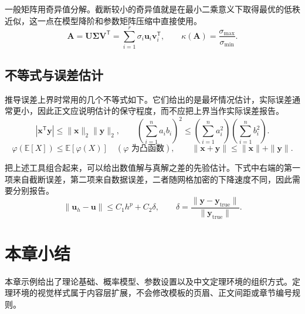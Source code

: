 一般矩阵用奇异值分解。截断较小的奇异值就是在最小二乘意义下取得最优的低秩近似，这一点在模型降阶和参数矩阵压缩中直接使用。
\begin{equation}
  \bm{A}=\bm{U}\bm{\Sigma}\bm{V}^{\mathsf T}
  =\sum_{i=1}^{r}\sigma_i\bm{u}_i\bm{v}_i^{\mathsf T},\qquad
  \kappa(\bm{A})=\frac{\sigma_{\max}}{\sigma_{\min}}.
  \label{eq:svd}
\end{equation}

\subsection{不等式与误差估计}

推导误差上界时常用的几个不等式如下。它们给出的是最坏情况估计，实际误差通常更小，因此正文应说明估计的保守程度，而不应把上界当作实际误差报告。
\begin{equation}
  |\bm{x}^{\mathsf T}\bm{y}|
  \leq\|\bm{x}\|_2\|\bm{y}\|_2,\qquad
  \left(\sum_{i=1}^{n}a_ib_i\right)^2
  \leq\left(\sum_{i=1}^{n}a_i^2\right)
       \left(\sum_{i=1}^{n}b_i^2\right).
  \label{eq:cauchy-schwarz}
\end{equation}
\begin{equation}
  \varphi(\mathbb{E}[X])\leq\mathbb{E}[\varphi(X)]
  \quad(\varphi\text{ 为凸函数}),\qquad
  \|\bm{x}+\bm{y}\|\leq\|\bm{x}\|+\|\bm{y}\|.
  \label{eq:jensen}
\end{equation}

把上述工具组合起来，可以给出数值解与真解之差的先验估计。下式中右端的第一项来自截断误差，第二项来自数据误差，二者随网格加密的下降速度不同，因此需要分别报告。
\begin{equation}
  \|\bm{u}_h-\bm{u}\|\leq C_1h^p+C_2\delta,\qquad
  \delta=\frac{\|\bm{y}-\bm{y}_{\mathrm{true}}\|}
  {\|\bm{y}_{\mathrm{true}}\|}.
  \label{eq:error-bound}
\end{equation}

\section{本章小结}

本章示例给出了理论基础、概率模型、参数设置以及中文定理环境的组织方式。定理环境的视觉样式属于内容层扩展，不会修改模板的页眉、正文间距或章节编号规则。
